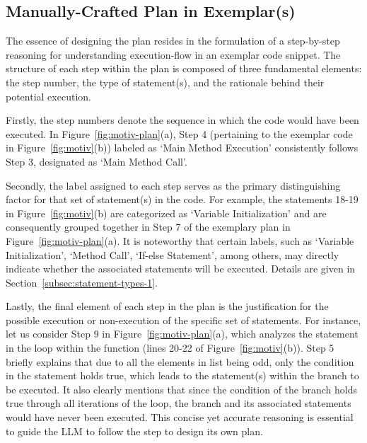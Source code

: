 


\subsection{Manually-Crafted Plan in Exemplar(s)}\label{sec:pfm_procedure-1}
The essence of designing the plan resides in the formulation of a step-by-step reasoning for understanding execution-flow in an exemplar code snippet. The structure of each step within the plan is composed of three fundamental elements: the step number, the type of statement(s), and the rationale behind their potential execution.

Firstly, the step numbers denote the sequence in which the code would have been executed. In Figure~\ref{fig:motiv-plan}(a), Step 4 (pertaining to the exemplar code in Figure~\ref{fig:motiv}(b)) labeled as `Main Method Execution' consistently follows Step 3, designated as `Main Method Call'.

Secondly, the label assigned to each step serves as the primary distinguishing factor for that set of statement(s) in the code. For example, the statements 18-19 in Figure~\ref{fig:motiv}(b) are categorized as `Variable Initialization' and are consequently grouped together in Step 7 of the exemplary plan in Figure~\ref{fig:motiv-plan}(a). It is noteworthy that certain labels, such as `Variable Initialization', `Method Call', `If-else Statement', among others, may directly indicate whether the associated statements will be executed. Details are given in Section~\ref{subsec:statement-types-1}.


Lastly, the final element of each step in the plan is the justification for the possible execution or non-execution of the
specific set of statements. For instance, let us consider Step 9 in Figure~\ref{fig:motiv-plan}(a), which analyzes the  statement in the  loop within the  function (lines 20-22 of Figure~\ref{fig:motiv}(b)). Step 5 briefly explains that due to all the elements in list  being odd, only the condition in the  statement holds true, which leads to the statement(s) within the  branch to be executed. It also clearly mentions that since the condition of the  branch holds true through all iterations of the  loop, the  branch and its associated statements would have never been executed. This concise yet accurate reasoning is essential to guide the LLM to follow the step to design its own plan.

